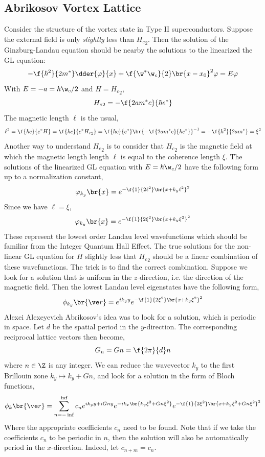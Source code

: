 \documentclass{article}
\newcommand{\vp}{\varphi}
\begin{document}
\subsection{Abrikosov Vortex Lattice}

Consider the structure of the vortex state in Type II superconductors. Suppose the external field is only \textit{slightly} less than ${H_{c}}_2$. Then the solution of the Ginzburg-Landau equation should be nearby the solutions to the linearized the GL equation:
\[ - \f{\hbar^2}{2 m^*} \dder{\vp}{x} + \f{\w^{*} \w_{c}}{2} \br{x - x_0}^2 \vp = E \vp \]
With $E = - a = \hbar \w_c /2$ and $H = {H_{c}}_{2}$,
\[ {H_{c}}_2 = - \f{2am^{*}c}{\hbar e^{*}} \]
The magnetic length $\ell$ is the usual,
\[ \ell^2 = \f{\hbar c}{e^{*} H} = \f{\hbar c}{e^{*} {H_{c}}_{2}} = \f{\hbar c}{e^{*}}\br{- \f{2am^{*}c}{\hbar e^{*}}}^{-1} = -\f{\hbar^2}{2 a m^{*}} = \xi^2  \]
Another way to understand ${H_{c}}_2$ is to consider that ${H_{c}}_2$ is the magnetic field at which the magnetic length length $\ell$ is equal to the coherence length $\xi$. The solutions of the linearized GL equation with $E = \hbar \w_c / 2$ have the following form up to a normalization constant,
\[ \vp_{k_y}\br{x} = e^{-\f{1}{2\ell^2}\br{x + k_y \ell^2}^2} \]
Since we have $\ell = \xi$,
\[ \vp_{k_y}\br{x} = e^{-\f{1}{2\xi^2}\br{x + k_y \xi^2}^2} \]
These represent the lowest order Landau level wavefunctions which should be familiar from the Integer Quantum Hall Effect. The true solutions for the non-linear GL equation for $H$ slightly less that ${H_{c}}_2$ should be a linear combination of these wavefunctions. The trick is to find the correct combination. Suppose we look for a solution that is uniform in the $z$-direction, i.e. the direction of the magnetic field. Then the lowest Landau level eigenstates have the following form,
\[ \phi_{k_y}\br{\ve r} = e^{ik_y y}e^{-\f{1}{2\xi^2}\br{x + k_y \xi^2}^2} \]
Alexei Alexeyevich Abrikosov's idea was to look for a solution, which is periodic in space. Let $d$ be the spatial period in the $y$-direction. The corresponding reciprocal lattice vectors then become,
\[ G_{n} = Gn = \f{2\pi}{d}n \]
where $n \in \Z$ is any integer. We can reduce the wavevector $k_y$ to the first Brillouin zone $k_{y} \mapsto k_y + Gn$, and look for a solution in the form of Bloch functions,
\[ \phi_k\br{\ve r} = \sum_{n=-\inf}^{\inf} c_n e^{ik_y y + i Gn y}e^{-ik_x\br{k_y \xi^2 + G n \xi^2}} e^{-\f{1}{2 \xi^2} \br{x + k_y \xi^2 + G n \xi^2}^2} \]
Where the appropriate coefficients $c_n$ need to be found. Note that if we take the coefficients $c_n$ to be periodic in $n$, then the solution will also be automatically period in the $x$-direction. Indeed, let $c_{n+m} = c_n$.
\end{document}
